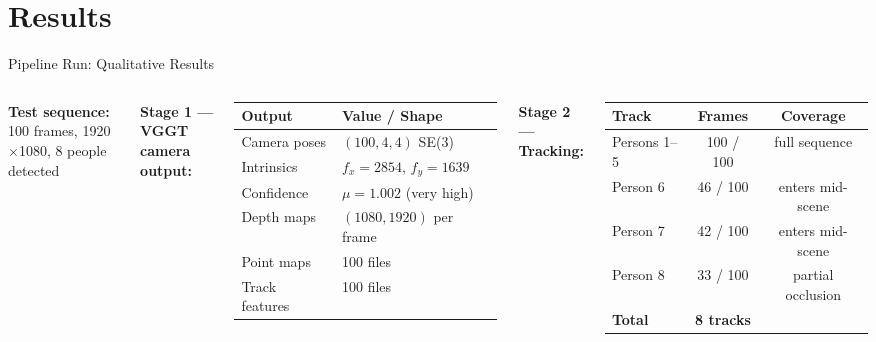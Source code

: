 \documentclass[aspectratio=169,11pt]{beamer}
\begin{document}
\section{Results}

\begin{frame}{Pipeline Run: Qualitative Results}
  \begin{columns}[T]
      \textbf{Test sequence:} 100 frames, 1920$\times$1080, 8 people detected

      \vspace{0.5em}
      \textbf{Stage 1 — VGGT camera output:}
      \vspace{0.3em}

      \begin{tabular}{ll}
        \toprule
        \textbf{Output} & \textbf{Value / Shape} \\
        \midrule
        Camera poses    & $(100, 4, 4)$ SE(3) \\
        Intrinsics      & $f_x{=}2854$, $f_y{=}1639$ \\
        Confidence      & $\mu{=}1.002$ \hspace{0.3em} (very high) \\
        Depth maps      & $(1080,1920)$ per frame \\
        Point maps      & 100 files \\
        Track features  & 100 files \\
        \bottomrule
      \end{tabular}

      \vspace{0.6em}
      \textbf{Stage 2 — Tracking:}
      \vspace{0.3em}

      \begin{tabular}{lcc}
        \toprule
        \textbf{Track} & \textbf{Frames} & \textbf{Coverage} \\
        \midrule
        Persons 1--5 & 100 / 100 & full sequence \\
        Person 6     &  46 / 100 & enters mid-scene \\
        Person 7     &  42 / 100 & enters mid-scene \\
        Person 8     &  33 / 100 & partial occlusion \\
        \midrule
        \textbf{Total} & \textbf{8 tracks} & \\
        \bottomrule
      \end{tabular}


\end{columns}
\end{frame}
\end{document}

